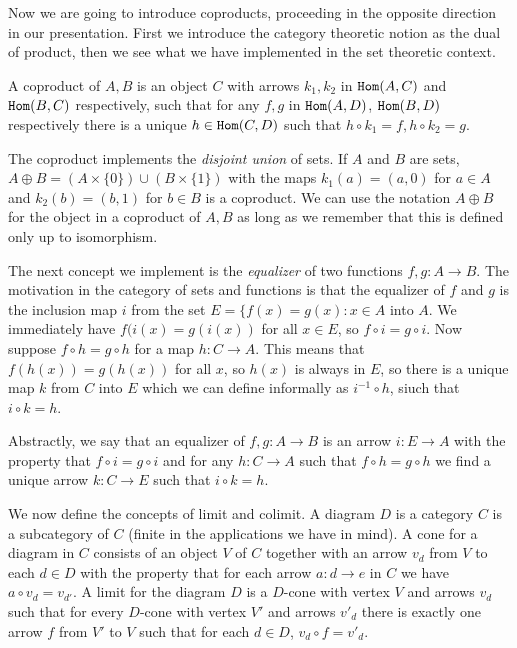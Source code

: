 \documentclass[12pt]{article}
\begin{document}
Now we are going to introduce coproducts, proceeding in the opposite direction in our presentation.  First we introduce the category theoretic notion as the dual of product, then we see what we have implemented in the set theoretic context.

A coproduct of $A,B$ is an object $C$ with arrows $k_1, k_2$ in ${\tt Hom}(A,C)$ and ${\tt Hom}(B,C)$ respectively, such that for any $f,g$ in ${\tt Hom}(A,D)$, ${\tt Hom}(B,D)$ respectively there is a unique $h \in {\tt Hom}(C,D)$ such that $ h \circ k_1 = f, h\circ k_2 =g$.

The coproduct implements the {\em disjoint union\/} of sets.  If $A$ and $B$ are sets, $A \oplus B = (A \times \{0\}) \cup (B \times \{1\})$ with the maps $k_1(a) = (a,0)$ for $a \in A$ and $k_2(b) = (b,1)$ for $b \in B$ is a coproduct.  We can use the notation $A \oplus B$ for
the object in a coproduct of $A,B$ as long as we remember that this is defined only up to isomorphism.

The next concept we implement is the {\em equalizer\/} of two functions $f, g:A \rightarrow B$.  The motivation in the category of sets and functions is that the equalizer of $f$ and $g$ is the inclusion map $i$ from  the set $E=\{f(x) = g(x):x \in A$ into $A$.  We immediately have $f(i(x) = g(i(x))$ for all $x \in E$, so $f \circ i = g\circ i$.
Now suppose $f \circ h = g \circ h$ for a map $h:C \rightarrow A$.  This means that $f(h(x)) = g(h(x))$ for all $x$, so $h(x)$ is always in $E$, so there is a unique map $k$ from $C$ into $E$ which we can define informally as $i^{-1}\circ h$, siuch that $i \circ k = h$.

Abstractly, we say that an equalizer of $f,g:A \rightarrow B$ is an arrow $i:E \rightarrow A$ with the property that $f \circ i = g\circ i$ and for any $h:C \rightarrow A$ such that $f \circ h = g \circ h$ we find a unique arrow $k:C \rightarrow E$ such that $i \circ  k = h$.

We now define the concepts of limit and colimit.  A diagram $D$ is a category $C$ is a subcategory of $C$ (finite in the applications we have in mind).  A cone for a diagram
in $C$ consists of an object $V$ of $C$ together with an arrow $v_d$ from $V$ to each $d \in D$ with the property that for each arrow $a:d \rightarrow e$ in $C$
we have $a \circ v_d = v_{d'}$.   A limit for the diagram $D$ is a $D$-cone with vertex $V$ and arrows $v_d$ such that for every $D$-cone with vertex $V'$ and arrows $v'_d$ there is exactly one arrow
$f$ from $V'$ to $V$ such that for each $d \in D$,  $v_d \circ f = v'_d$.
\end{document}
